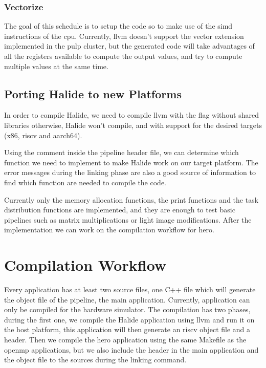 	\subsubsection{Vectorize}
	The goal of this schedule is to setup the code so to make use of the \gls{simd} instructions of the \gls{cpu}. Currently, \gls{llvm} doesn't support the vector extension  implemented in the \gls{pulp} cluster, but the generated code will take advantages of all the registers available to compute the output values, and try to compute multiple values at the same time.


	\subsection { Porting Halide to new Platforms}

	In order to compile Halide, we need to compile \gls{llvm} with the flag without shared libraries otherwise, Halide won't compile, and  with support for the desired targets (x86, \gls{riscv} and \gls{aarch64}).

		Using the  comment inside the pipeline header file, we can determine which function we need to implement to make Halide work on our target platform. The error messages during the linking phase are also a good source of information to find which function are needed to compile the code. 

		Currently only the memory allocation functions, the print functions and the task distribution functions are implemented, and they are enough to test basic pipelines such as matrix multiplications or light image modifications.
	After the implementation we can work on the compilation workflow for hero.


\section{Compilation Workflow}
	Every application has at least two source files, one C++ file which will generate the object file of the pipeline, the main application. 
	Currently, application can only be compiled for the hardware simulator.
	The compilation has two phases, during the first one, we compile the Halide application using \gls{llvm} and run it on the host platform, this application will then generate an \gls{riscv} object file and a header.
	Then we compile the hero application using the same Makefile as the \gls{openmp} applications, but we also include the header in the main application and the object file to the sources during the linking command.

